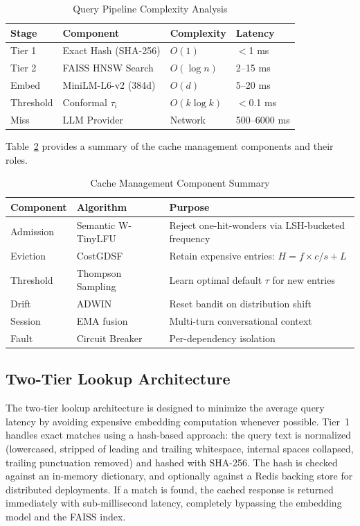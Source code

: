 \documentclass[conference]{IEEEtran}
\begin{document}
\begin{table}[t]
\centering
\caption{Query Pipeline Complexity Analysis}
\label{tab:pipeline}
\begin{tabular}{llll}
\toprule
\textbf{Stage} & \textbf{Component} & \textbf{Complexity} & \textbf{Latency} \\
\midrule
Tier 1 & Exact Hash (SHA-256) & $O(1)$ & $<$1 ms \\
Tier 2 & FAISS HNSW Search & $O(\log n)$ & 2--15 ms \\
Embed & MiniLM-L6-v2 (384d) & $O(d)$ & 5--20 ms \\
Threshold & Conformal $\tau_i$ & $O(k \log k)$ & $<$0.1 ms \\
Miss & LLM Provider & Network & 500--6000 ms \\
\bottomrule
\end{tabular}
\end{table}

Table~\ref{tab:components} provides a summary of the cache management components and their roles.

\begin{table}[t]
\centering
\caption{Cache Management Component Summary}
\label{tab:components}
\begin{tabular}{p{1.8cm}p{2.2cm}p{3.2cm}}
\toprule
\textbf{Component} & \textbf{Algorithm} & \textbf{Purpose} \\
\midrule
Admission & Semantic W-TinyLFU & Reject one-hit-wonders via LSH-bucketed frequency \\
Eviction & CostGDSF & Retain expensive entries: $H = f \times c / s + L$ \\
Threshold & Thompson Sampling & Learn optimal default $\tau$ for new entries \\
Drift & ADWIN & Reset bandit on distribution shift \\
Session & EMA fusion & Multi-turn conversational context \\
Fault & Circuit Breaker & Per-dependency isolation \\
\bottomrule
\end{tabular}
\end{table}

\subsection{Two-Tier Lookup Architecture}

The two-tier lookup architecture is designed to minimize the average query latency by avoiding expensive embedding computation whenever possible. Tier~1 handles exact matches using a hash-based approach: the query text is normalized (lowercased, stripped of leading and trailing whitespace, internal spaces collapsed, trailing punctuation removed) and hashed with SHA-256. The hash is checked against an in-memory dictionary, and optionally against a Redis backing store for distributed deployments. If a match is found, the cached response is returned immediately with sub-millisecond latency, completely bypassing the embedding model and the FAISS index.
\end{document}
